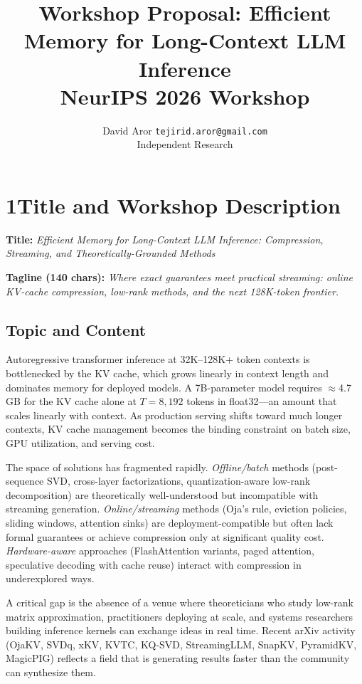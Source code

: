 \documentclass{article}
\title{\textbf{Workshop Proposal: Efficient Memory for Long-Context LLM Inference}\\
\large NeurIPS 2026 Workshop}
\author{
  David Aror \quad \texttt{tejirid.aror@gmail.com}\\
  Independent Research
}
\date{}
\begin{document}
\maketitle


\section*{1\quad Title and Workshop Description}

\textbf{Title:} \emph{Efficient Memory for Long-Context LLM Inference: Compression, Streaming, and Theoretically-Grounded Methods}

\textbf{Tagline (140 chars):}
\textit{Where exact guarantees meet practical streaming: online KV-cache compression, low-rank methods, and the next 128K-token frontier.}

\subsection*{Topic and Content}

Autoregressive transformer inference at 32K--128K+ token contexts is bottlenecked
by the KV cache, which grows linearly in context length and dominates memory for
deployed models.  A 7B-parameter model requires $\approx$4.7\,GB for the KV cache
alone at $T{=}8{,}192$ tokens in float32---an amount that scales linearly with
context.  As production serving shifts toward much longer contexts, KV cache
management becomes the binding constraint on batch size, GPU utilization, and
serving cost.

The space of solutions has fragmented rapidly.  \emph{Offline/batch} methods
(post-sequence SVD, cross-layer factorizations, quantization-aware low-rank
decomposition) are theoretically well-understood but incompatible with streaming
generation.  \emph{Online/streaming} methods (Oja's rule, eviction policies,
sliding windows, attention sinks) are deployment-compatible but often lack
formal guarantees or achieve compression only at significant quality cost.
\emph{Hardware-aware} approaches (FlashAttention variants, paged attention,
speculative decoding with cache reuse) interact with compression in
underexplored ways.

A critical gap is the absence of a venue where theoreticians who study
low-rank matrix approximation, practitioners deploying at scale, and
systems researchers building inference kernels can exchange ideas in real time.
Recent arXiv activity (OjaKV, SVDq, xKV, KVTC, KQ-SVD, StreamingLLM, SnapKV,
PyramidKV, MagicPIG) reflects a field that is generating results faster than the
community can synthesize them.
\end{document}
